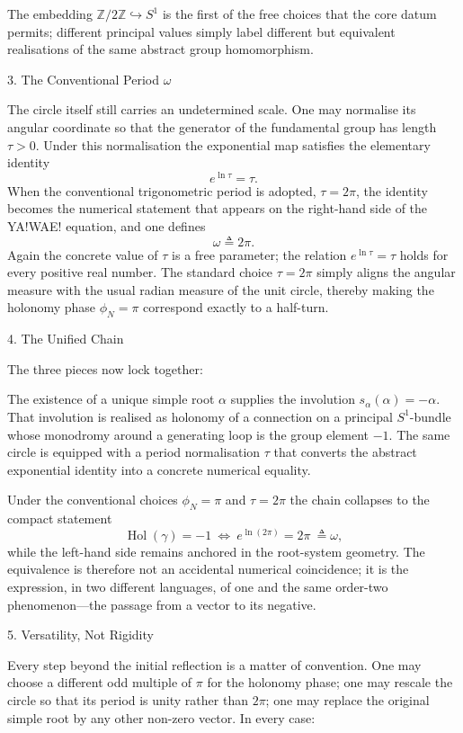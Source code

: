 The embedding \(\mathbb{Z}/2\mathbb{Z}\hookrightarrow S^1\) is the first of the free choices that the core datum permits; different principal values simply label different but equivalent realisations of the same abstract group homomorphism.

3. The Conventional Period \(\omega\)

The circle itself still carries an undetermined scale. One may normalise its angular coordinate so that the generator of the fundamental group has length \(\tau>0\). Under this normalisation the exponential map satisfies the elementary identity
\[
e^{\ln\tau}=\tau.
\]
When the conventional trigonometric period is adopted, \(\tau=2\pi\), the identity becomes the numerical statement that appears on the right-hand side of the YA!WAE! equation, and one defines
\[
\omega\triangleq 2\pi.
\]
Again the concrete value of \(\tau\) is a free parameter; the relation \(e^{\ln\tau}=\tau\) holds for every positive real number. The standard choice \(\tau=2\pi\) simply aligns the angular measure with the usual radian measure of the unit circle, thereby making the holonomy phase \(\phi_N=\pi\) correspond exactly to a half-turn.

4. The Unified Chain

The three pieces now lock together:

The existence of a unique simple root \(\alpha\) supplies the involution \(s_\alpha(\alpha)=-\alpha\).  
That involution is realised as holonomy of a connection on a principal \(S^1\)-bundle whose monodromy around a generating loop is the group element \(-1\).  
The same circle is equipped with a period normalisation \(\tau\) that converts the abstract exponential identity into a concrete numerical equality.

Under the conventional choices \(\phi_N=\pi\) and \(\tau=2\pi\) the chain collapses to the compact statement
\[
\operatorname{Hol}(\gamma)=-1\ \Longleftrightarrow\ e^{\ln(2\pi)}=2\pi\ \triangleq\omega,
\]
while the left-hand side remains anchored in the root-system geometry. The equivalence is therefore not an accidental numerical coincidence; it is the expression, in two different languages, of one and the same order-two phenomenon—the passage from a vector to its negative.

5. Versatility, Not Rigidity

Every step beyond the initial reflection is a matter of convention. One may choose a different odd multiple of \(\pi\) for the holonomy phase; one may rescale the circle so that its period is unity rather than \(2\pi\); one may replace the original simple root by any other non-zero vector. In every case:

